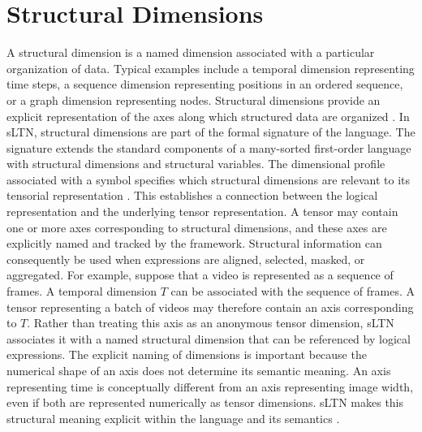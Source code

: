 \section{Structural Dimensions}
\noindent
A structural dimension is a named dimension associated with a particular organization of data. Typical examples include a temporal dimension representing time steps, a sequence dimension representing positions in an ordered sequence, or a graph dimension representing nodes. Structural dimensions provide an explicit representation of the axes along which structured data are organized \cite{rinaldi2026sltn}.
In sLTN, structural dimensions are part of the formal signature of the language. The signature extends the standard components of a many-sorted first-order language with structural dimensions and structural variables. The dimensional profile associated with a symbol specifies which structural dimensions are relevant to its tensorial representation \cite{rinaldi2026sltn}.
This establishes a connection between the logical representation and the underlying tensor representation. A tensor may contain one or more axes corresponding to structural dimensions, and these axes are explicitly named and tracked by the framework. Structural information can consequently be used when expressions are aligned, selected, masked, or aggregated.
For example, suppose that a video is represented as a sequence of frames. A temporal dimension $T$ can be associated with the sequence of frames. A tensor representing a batch of videos may therefore contain an axis corresponding to $T$. Rather than treating this axis as an anonymous tensor dimension, sLTN associates it with a named structural dimension that can be referenced by logical expressions.
The explicit naming of dimensions is important because the numerical shape of an axis does not determine its semantic meaning. An axis representing time is conceptually different from an axis representing image width, even if both are represented numerically as tensor dimensions. sLTN makes this structural meaning explicit within the language and its semantics \cite{rinaldi2026sltn}.

